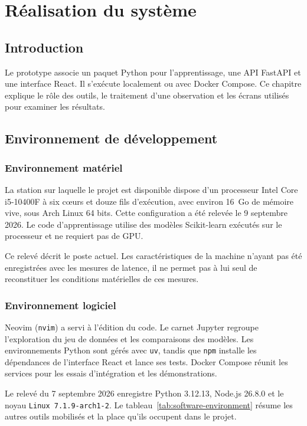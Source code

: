\chapter{R\'ealisation du syst\`eme}
\label{chap:realisation}

\section{Introduction}

Le prototype associe un paquet Python pour l'apprentissage, une API FastAPI et
une interface React. Il s'exécute localement ou avec Docker Compose. Ce chapitre
explique le rôle des outils, le traitement d'une observation et les écrans
utilisés pour examiner les résultats.

\section{Environnement de d\'eveloppement}

\subsection{Environnement mat\'eriel}

La station sur laquelle le projet est disponible dispose d'un processeur
Intel Core i5-10400F à six cœurs et douze fils d'exécution, avec environ
16~Go de mémoire vive, sous Arch Linux 64 bits. Cette configuration a été
relevée le 9 septembre 2026. Le code d'apprentissage utilise des modèles
Scikit-learn exécutés sur le processeur et ne requiert pas de GPU.

Ce relevé décrit le poste actuel. Les caractéristiques de la machine n'ayant
pas été enregistrées avec les mesures de latence, il ne permet pas à lui seul
de reconstituer les conditions matérielles de ces mesures.

\subsection{Environnement logiciel}

Neovim (\texttt{nvim}) a servi à l'édition du code. Le carnet Jupyter regroupe
l'exploration du jeu de données et les comparaisons des modèles. Les
environnements Python sont gérés avec \texttt{uv}, tandis que \texttt{npm}
installe les dépendances de l'interface React et lance ses tests. Docker
Compose réunit les services pour les essais d'intégration et les
démonstrations.

Le relev\'e du 7 septembre 2026 enregistre Python 3.12.13, Node.js 26.8.0 et le
noyau \texttt{Linux 7.1.9-arch1-2}. Le tableau~\ref{tab:software-environment}
r\'esume les autres outils mobilis\'es et la place qu'ils occupent dans le projet.

